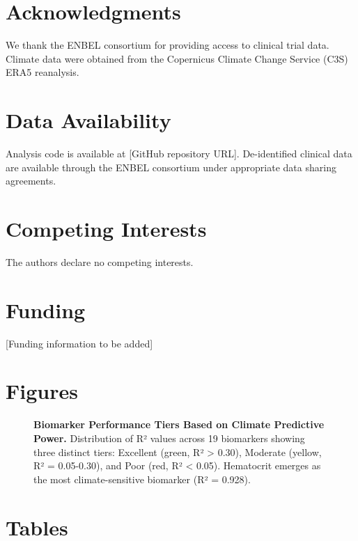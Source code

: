 \documentclass[11pt,a4paper]{article}
\begin{document}
\section*{Acknowledgments}

We thank the ENBEL consortium for providing access to clinical trial data. Climate data were obtained from the Copernicus Climate Change Service (C3S) ERA5 reanalysis.

\section*{Data Availability}

Analysis code is available at [GitHub repository URL]. De-identified clinical data are available through the ENBEL consortium under appropriate data sharing agreements.

\section*{Competing Interests}

The authors declare no competing interests.

\section*{Funding}

[Funding information to be added]




\clearpage

\section*{Figures}

\begin{figure}[ht]
    \centering
    \caption{\textbf{Biomarker Performance Tiers Based on Climate Predictive Power.} Distribution of R² values across 19 biomarkers showing three distinct tiers: Excellent (green, R² > 0.30), Moderate (yellow, R² = 0.05-0.30), and Poor (red, R² < 0.05). Hematocrit emerges as the most climate-sensitive biomarker (R² = 0.928).}
    \label{fig:performance_tiers}
\end{figure}


\clearpage

\section*{Tables}
\end{document}
